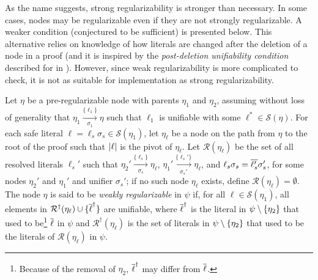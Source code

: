 %



As the name suggests, strong regularizability is stronger than necessary. In some cases, nodes may be regularizable even if they are not strongly regularizable. A weaker condition (conjectured to be sufficient) is presented below. This alternative relies on knowledge of how literals are changed after the deletion of a node in a proof (and it is inspired by the \emph{post-deletion unifiability condition} described for {\FOLowerUnits} in \cite{GFOLU}). However, since weak regularizability is more complicated to check, it is not as suitable for implementation as strong regularizability. 
\begin{definition}\label{def:postdelprop}
Let $\eta$ be a pre-regularizable node with parents $\eta_1$ and $\eta_2$, assuming without loss of generality that $\eta_1 \xrightarrow[\sigma_1]{\{\ell_1\} } \eta$ 
such that $\ell_1$ is unifiable with some $\ell^* \in \mathcal{S}(\eta)$.
For each safe literal $\ell = \ell_s\sigma_s \in \mathcal{S}(\eta_1)$, let $\eta_\ell$ be a node on the path from $\eta$ to the root of the proof such that $\lvert\ell\rvert$ is the pivot of $\eta_\ell$.
Let $\mathcal{R}(\eta_\ell)$ be the set of all resolved literals $\ell_s'$ such that $\eta_2' \xrightarrow[\sigma_s]{\{\ell_s\} } \eta_\ell$, $\eta_1' \xrightarrow[\sigma_s']{\{\ell_s'\} } \eta_\ell$, and $\ell_s\sigma_s=\overline{\ell_s'}\sigma_s'$, for some nodes $\eta_2'$ and $\eta_1'$ and unifier $\sigma_s'$; if no such node $\eta_\ell$ exists, define $\mathcal{R}(\eta_\ell)=\emptyset$.
The node $\eta$ is said to be \emph{weakly regularizable} in $\psi$ if, for all $\ell \in \mathcal{S}(\eta_1)$, all elements in $\mathcal{R}^{\dagger}(\eta_\ell) \cup \{ \overline{\ell}^\dagger \}$ are unifiable, where $\overline{\ell}^{\dagger}$ is the literal in $\psi \setminus \{\eta_2\}$ that used to be\footnote{Because of the removal of $\eta_2$, $\overline{\ell}^{\dagger}$ may differ from $\overline{\ell}$.} $\overline{\ell}$ in $\psi$ and $\mathcal{R}^{\dagger}(\eta_\ell)$ is the set of literals in $\psi \setminus \{\eta_2\}$ that used to be the literals of $\mathcal{R}(\eta_\ell)$ in $\psi$.
\end{definition}



